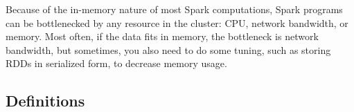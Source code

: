 \par Because of the in-memory nature of most Spark computations, Spark programs can be bottlenecked by any resource in the cluster: CPU, network bandwidth, or memory. Most often, if the data fits in memory, the bottleneck is network bandwidth, but sometimes, you also need to do some tuning, such as storing RDDs in serialized form, to decrease memory usage. 
\subsection{Definitions}

